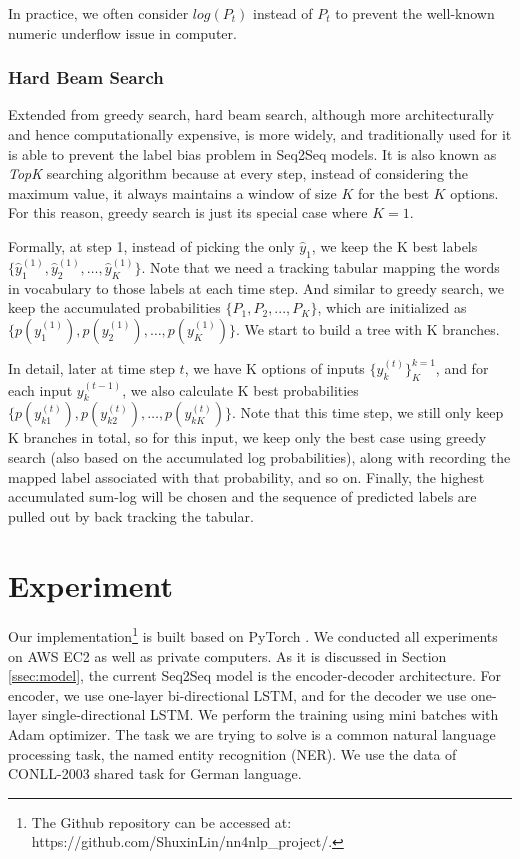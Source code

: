 \documentclass[11pt,a4paper]{article}
\begin{document}
In practice, we often consider $log(P_t)$ instead of $P_t$ to prevent the well-known numeric underflow issue in computer. 

\subsubsection{Hard Beam Search}
Extended from greedy search, hard beam search, although more architecturally and hence computationally expensive, is more widely, and traditionally used \cite{seq2seq_2014} for it is able to prevent the label bias problem in Seq2Seq models. It is also known as \textit{TopK} searching algorithm because at every step, instead of considering the maximum value, it always maintains a window of size $K$ for the best $K$ options. For this reason, greedy search is just its special case where $K=1$. 

Formally, at step 1, instead of picking the only $\hat{y}_1$, we keep the K best labels $\{ \hat{y}^{(1)}_{1}, \hat{y}^{(1)}_{2}, \dots, \hat{y}^{(1)}_{K} \}$. Note that we need a tracking tabular mapping the words in vocabulary to those labels at each time step. And similar to greedy search, we keep the accumulated probabilities $\{ P_1, P_2, ..., P_K \}$, which are initialized as 
$\{ p(y^{(1)}_{1}), p(y^{(1)}_{2}), \dots, p(y^{(1)}_{K}) \}$. We start to build a tree with K branches. 

In detail, later at time step $t$, we have K options of inputs $\{ y^{(t)}_k\}^{k=1}_K$, and for each input $y^{(t-1)}_{k}$, we also calculate K best probabilities $\{ p({y}^{(t)}_{k1}), p({y}^{(t)}_{k2}), \dots, p({y}^{(t)}_{kK}) \}$. Note that this time step, we still only keep K branches in total, so for this input, we keep only the best case using greedy search (also based on the accumulated log probabilities), along with recording the mapped label associated with that probability, and so on. Finally, the highest accumulated sum-log will be chosen and the sequence of predicted labels are pulled out by back tracking the tabular. 



\section{Experiment}

Our implementation\footnote{The Github repository can be accessed at: https://github.com/ShuxinLin/nn4nlp\_project/.} is built based on PyTorch \cite{paszke2017automatic}. We conducted all experiments on AWS EC2 as well as private computers. As it is discussed in Section \ref{ssec:model}, the current Seq2Seq model is the encoder-decoder architecture. For encoder, we use one-layer bi-directional LSTM, and for the decoder we use one-layer single-directional LSTM. We perform the training using mini batches with Adam optimizer. The task we are trying to solve is a common natural language processing task, the named entity recognition (NER). We use the data of CONLL-2003 shared task \cite{tjongkimsang2003conll} for German language. 
\end{document}
